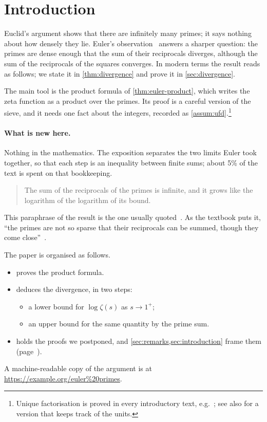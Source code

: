\section{Introduction}
\label{sec:introduction}

Euclid's argument shows that there are infinitely many primes; it says
nothing about how densely they lie. Euler's observation~\cite{euler1737}
answers a sharper question: the primes are dense enough that the sum of
their reciprocals diverges, although the sum of the reciprocals of the
squares converges. In modern terms the result reads as follows; we state it
in \cref{thm:divergence} and prove it in \cref{sec:divergence}.

The main tool is the product formula of \cref{thm:euler-product}, which
writes the zeta function as a product over the primes. Its proof is a
careful version of the sieve, and it needs one fact about the integers,
recorded as \cref{assum:ufd}.\footnote{Unique factorisation is proved in
  every introductory text, e.g.\ \citet[Theorem~2]{hardywright}; see also
  \citep[Chapter~1, {\S}1.2]{primer2001} for a version that keeps track of
  the units.}

\paragraph{What is new here.} Nothing in the mathematics. The exposition
separates the two limits Euler took together, so that each step is an
inequality between finite sums; about 5\% of the text is spent on that
bookkeeping.

\begin{quote}
The sum of the reciprocals of the primes is infinite, and it grows like
the logarithm of the logarithm of its bound.
\end{quote}
This paraphrase of the result is the one usually quoted~\cite[p.~351]{primer2001}.
As the textbook puts it, ``the primes are not so sparse that their
reciprocals can be summed, though they come close''~\cite{primer2001}.

\vspace{1em}

The paper is organised as follows.
\begin{itemize}
  \item {} proves the product formula.
  \item {} deduces the divergence, in two steps:
  \begin{itemize}
    \item a lower bound for $\log \zeta(s)$ as $s \to 1^+$;
    \item an upper bound for the same quantity by the prime sum.
  \end{itemize}
  \item {} holds the proofs we postponed, and
  \cref{sec:remarks,sec:introduction} frame them (page~\pageref{sec:remarks}).
\end{itemize}
A machine-readable copy of the argument is at
\url{https://example.org/euler%20primes}.

\newpage
